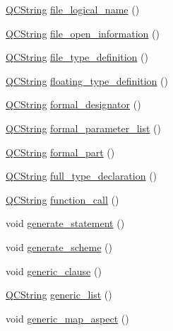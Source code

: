 \begin{DoxyCompactItemize}
\item 
\hyperlink{class_q_c_string}{Q\+C\+String} \hyperlink{classvhdl_1_1parser_1_1_vhdl_parser_adff1963f7477451af056b790f0361e85}{file\+\_\+logical\+\_\+name} ()
\item 
\hyperlink{class_q_c_string}{Q\+C\+String} \hyperlink{classvhdl_1_1parser_1_1_vhdl_parser_ae9b0130d5f1f82622b6577994e059669}{file\+\_\+open\+\_\+information} ()
\item 
\hyperlink{class_q_c_string}{Q\+C\+String} \hyperlink{classvhdl_1_1parser_1_1_vhdl_parser_a16b06e65c2e7effb8d68eb1dbc5492b7}{file\+\_\+type\+\_\+definition} ()
\item 
\hyperlink{class_q_c_string}{Q\+C\+String} \hyperlink{classvhdl_1_1parser_1_1_vhdl_parser_a05bdf94cb610433c98f71fbd0549a484}{floating\+\_\+type\+\_\+definition} ()
\item 
\hyperlink{class_q_c_string}{Q\+C\+String} \hyperlink{classvhdl_1_1parser_1_1_vhdl_parser_a731121a6f5752f5f1a53bd956907fcfa}{formal\+\_\+designator} ()
\item 
\hyperlink{class_q_c_string}{Q\+C\+String} \hyperlink{classvhdl_1_1parser_1_1_vhdl_parser_afde1862ddf3e8910df785cbb3c6d16e0}{formal\+\_\+parameter\+\_\+list} ()
\item 
\hyperlink{class_q_c_string}{Q\+C\+String} \hyperlink{classvhdl_1_1parser_1_1_vhdl_parser_a4e697903a8bfba8ce3811a879cce1392}{formal\+\_\+part} ()
\item 
\hyperlink{class_q_c_string}{Q\+C\+String} \hyperlink{classvhdl_1_1parser_1_1_vhdl_parser_a702e0748837d0e3d097d1f244751ce2d}{full\+\_\+type\+\_\+declaration} ()
\item 
\hyperlink{class_q_c_string}{Q\+C\+String} \hyperlink{classvhdl_1_1parser_1_1_vhdl_parser_ad6c3d22e4d4e2a4ec5c061c583a330ff}{function\+\_\+call} ()
\item 
void \hyperlink{classvhdl_1_1parser_1_1_vhdl_parser_acac2c04b2167fdcf2a5f675d90d876cb}{generate\+\_\+statement} ()
\item 
void \hyperlink{classvhdl_1_1parser_1_1_vhdl_parser_a93f6adc7de2b091fbcfc13d538166d02}{generate\+\_\+scheme} ()
\item 
void \hyperlink{classvhdl_1_1parser_1_1_vhdl_parser_a873fc795b2e5932adafb0ec81373f36e}{generic\+\_\+clause} ()
\item 
\hyperlink{class_q_c_string}{Q\+C\+String} \hyperlink{classvhdl_1_1parser_1_1_vhdl_parser_a01215bda10d4f38f3e12813f9eea3b04}{generic\+\_\+list} ()
\item 
void \hyperlink{classvhdl_1_1parser_1_1_vhdl_parser_a51e84d019ce760c0391d8fb7f93162f9}{generic\+\_\+map\+\_\+aspect} ()

\end{DoxyCompactItemize}
